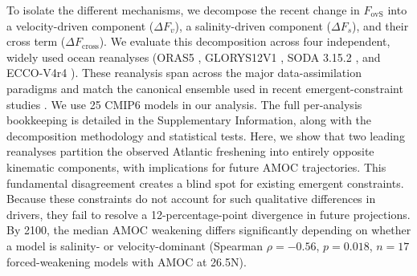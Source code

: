 \documentclass[11pt,a4paper]{article}
\begin{document}
To isolate the different mechanisms, we decompose the recent change in \(F_{\mathrm{ovS}}\) into a velocity-driven component (\(\Delta F_v\)), a salinity-driven component (\(\Delta F_s\)), and their cross term (\(\Delta F_{\mathrm{cross}}\)). We evaluate this decomposition across four independent, widely used ocean reanalyses (ORAS5 \citep{Zuo2019}, GLORYS12V1 \citep{Lellouche2021}, SODA 3.15.2 \citep{Carton2018}, and ECCO-V4r4 \citep{Forget2015}). These reanalysis span across the major data-assimilation paradigms and match the canonical ensemble used in recent emergent-constraint studies \citep{Portmann2026}. We use 25 CMIP6 models in our analysis. The full per-analysis bookkeeping is detailed in the Supplementary Information, along with the decomposition methodology and statistical tests. Here, we show that two leading reanalyses partition the observed Atlantic freshening into entirely opposite kinematic components, with implications for future AMOC trajectories. This fundamental disagreement creates a blind spot for existing emergent constraints. Because these constraints do not account for such qualitative differences in drivers, they fail to resolve a 12-percentage-point divergence in future projections. By 2100, the median AMOC weakening differs significantly depending on whether a model is salinity- or velocity-dominant (Spearman $\rho = -0.56$, $p = 0.018$, $n = 17$ forced-weakening models with AMOC at 26.5\textdegree N).
\end{document}
